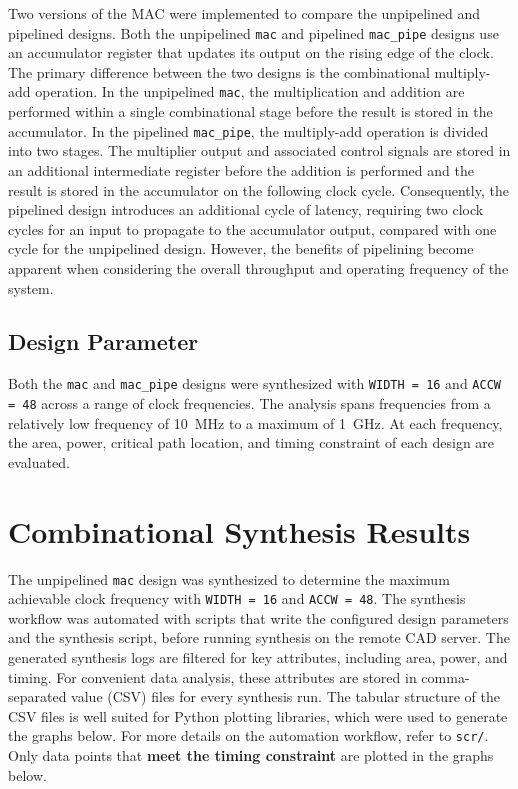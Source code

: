 \documentclass[a4paper,11pt]{article}
\begin{document}
Two versions of the MAC were implemented to compare the unpipelined and pipelined designs. Both the unpipelined \texttt{mac} and pipelined \texttt{mac\_pipe} designs use an accumulator register that updates its output on the rising edge of the clock. The primary difference between the two designs is the combinational multiply-add operation. In the unpipelined \texttt{mac}, the multiplication and addition are performed within a single combinational stage before the result is stored in the accumulator. In the pipelined \texttt{mac\_pipe}, the multiply-add operation is divided into two stages. The multiplier output and associated control signals are stored in an additional intermediate register before the addition is performed and the result is stored in the accumulator on the following clock cycle. Consequently, the pipelined design introduces an additional cycle of latency, requiring two clock cycles for an input to propagate to the accumulator output, compared with one cycle for the unpipelined design. However, the benefits of pipelining become apparent when considering the overall throughput and operating frequency of the system. 

\subsection{Design Parameter}
Both the \texttt{mac} and \texttt{mac\_pipe} designs were synthesized with \texttt{WIDTH = 16} and \texttt{ACCW = 48} across a range of clock frequencies. The analysis spans frequencies from a relatively low frequency of 10~MHz to a maximum of 1~GHz. At each frequency, the area, power, critical path location, and timing constraint of each design are evaluated.

\newpage
\section{Combinational Synthesis Results}

The unpipelined \texttt{mac} design was synthesized to determine the maximum achievable clock frequency with \texttt{WIDTH = 16} and \texttt{ACCW = 48}. The synthesis workflow was automated with scripts that write the configured design parameters and the synthesis script, before running synthesis on the remote CAD server. The generated synthesis logs are filtered for key attributes, including area, power, and timing. For convenient data analysis, these attributes are stored in comma-separated value (CSV) files for every synthesis run. The tabular structure of the CSV files is well suited for Python plotting libraries, which were used to generate the graphs below. For more details on the automation workflow, refer to \texttt{scr/}. Only data points that \textbf{meet the timing constraint} are plotted in the graphs below.
\end{document}
